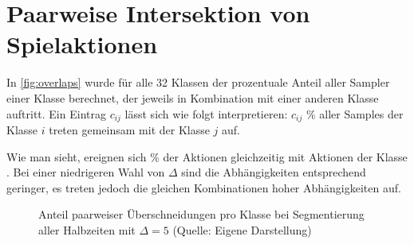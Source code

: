 \chapter{Paarweise Intersektion von Spielaktionen}
\label{ch:overlaps}

In \autoref{fig:overlaps} wurde für alle 32 Klassen der prozentuale Anteil aller Sampler einer Klasse berechnet, der jeweils in Kombination mit einer anderen Klasse auftritt.
Ein Eintrag $c_{ij}$ lässt sich wie folgt interpretieren:
$c_{ij}$ \% aller Samples der Klasse $i$ treten gemeinsam mit der Klasse $j$ auf.

Wie man sieht, ereignen sich  \% der Aktionen  gleichzeitig mit Aktionen der Klasse .
Bei einer niedrigeren Wahl von $\Delta$ sind die Abhängigkeiten entsprechend geringer, es treten jedoch die gleichen Kombinationen hoher Abhängigkeiten auf.

\begin{figure}
    \centering
    \caption[Anteil paarweiser Überschneidungen pro Klasse]{Anteil paarweiser Überschneidungen pro Klasse bei Segmentierung aller Halbzeiten mit $\Delta = 5$ (Quelle: Eigene Darstellung)}
    \label{fig:overlaps}
\end{figure}
